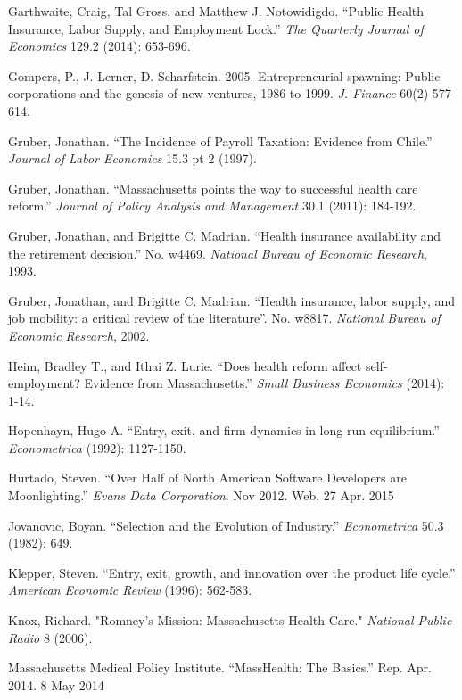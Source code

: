 \documentclass[12pt]{article}
\begin{document}
\begin{thebibliography}{99}
Garthwaite, Craig, Tal Gross, and Matthew J. Notowidigdo. ``Public Health Insurance, Labor Supply, and Employment Lock.'' \emph{The Quarterly Journal of Economics} 129.2 (2014): 653-696.

Gompers, P., J. Lerner, D. Scharfstein. 2005. Entrepreneurial spawning: Public corporations and the genesis of new ventures, 1986 to 1999. \emph{J. Finance} 60(2) 577-614.

Gruber, Jonathan. ``The Incidence of Payroll Taxation: Evidence from Chile.'' \emph{Journal of Labor Economics} 15.3 pt 2 (1997).


Gruber, Jonathan. ``Massachusetts points the way to successful health care reform.'' \emph{Journal of Policy Analysis and Management} 30.1 (2011): 184-192.
        
Gruber, Jonathan, and Brigitte C. Madrian. ``Health insurance availability and the retirement decision.'' No. w4469. \emph{National Bureau of Economic Research}, 1993.
        
Gruber, Jonathan, and Brigitte C. Madrian. ``Health insurance, labor supply, and job mobility: a critical review of the literature''. No. w8817. \emph{National Bureau of Economic Research}, 2002.      
        
Heim, Bradley T., and Ithai Z. Lurie. ``Does health reform affect self-employment? Evidence from Massachusetts.'' \emph{Small Business Economics} (2014): 1-14.

Hopenhayn, Hugo A. ``Entry, exit, and firm dynamics in long run equilibrium.'' \emph{Econometrica} (1992): 1127-1150.

Hurtado, Steven. ``Over Half of North American Software Developers are Moonlighting.'' \emph{Evans Data Corporation}. Nov 2012. Web. 27 Apr. 2015

Jovanovic, Boyan. ``Selection and the Evolution of Industry.'' \emph{Econometrica} 50.3 (1982): 649.

Klepper, Steven. ``Entry, exit, growth, and innovation over the product life cycle.'' \emph{American Economic Review} (1996): 562-583.

Knox, Richard. "Romney’s Mission: Massachusetts Health Care." \emph{National Public Radio} 8 (2006).

Massachusetts Medical Policy Institute. ``MassHealth: The Basics.'' Rep. Apr. 2014. 8 May 2014 



\end{thebibliography}
\end{document}
